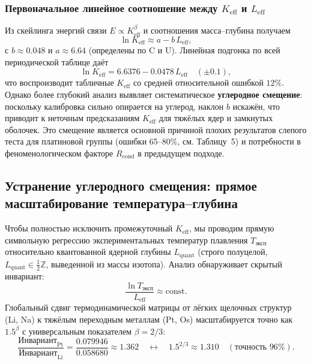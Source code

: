\documentclass[12pt,a4paper]{article}
\theoremstyle{remark}
\begin{document}
	\subsubsection{Первоначальное линейное соотношение между \(K_{\mathrm{eff}}\) и \(L_{\mathrm{eff}}\)}
	Из скейлинга энергий связи \(E \propto K_{\mathrm{eff}}^{\beta}\) и соотношения масса–глубина получаем
	\begin{equation}
		\ln K_{\mathrm{eff}} \approx a - b\,L_{\mathrm{eff}},
		\label{eq:lnK_vs_L_old}
	\end{equation}
	с \(b \approx 0.048\) и \(a \approx 6.64\) (определены по C и U).  
	Линейная подгонка по всей периодической таблице даёт
	\[
	\ln K_{\mathrm{eff}} = 6.6376 - 0.0478\,L_{\mathrm{eff}} \quad (\pm 0.1),
	\]
	что воспроизводит табличные \(K_{\mathrm{eff}}\) со средней относительной ошибкой \(12\%\).  
	Однако более глубокий анализ выявляет систематическое \textbf{углеродное смещение}: поскольку калибровка сильно опирается на углерод, наклон \(b\) искажён, что приводит к неточным предсказаниям \(K_{\mathrm{eff}}\) для тяжёлых ядер и замкнутых оболочек. Это смещение является основной причиной плохих результатов слепого теста для платиновой группы (ошибки 65–80\%, см. Таблицу~5) и потребности в феноменологическом факторе \(R_{\text{cond}}\) в предыдущем подходе.
	
	\subsection{Устранение углеродного смещения: прямое масштабирование температура–глубина}
	\label{subsec:direct_mass}
	
	Чтобы полностью исключить промежуточный \(K_{\mathrm{eff}}\), мы проводим прямую символьную регрессию экспериментальных температур плавления \(T_{\text{эксп}}\) относительно квантованной ядерной глубины \(L_{\mathrm{quant}}\) (строго полуцелой, \(L_{\mathrm{quant}} \in \frac{1}{2}\mathbb{Z}\), выведенной из массы изотопа). Анализ обнаруживает скрытый инвариант:
	\[
	\frac{\ln T_{\text{эксп}}}{L_{\mathrm{eff}}}\approx \text{const}.
	\]
	Глобальный сдвиг термодинамической матрицы от лёгких щелочных структур (Li, Na) к тяжёлым переходным металлам (Pt, Os) масштабируется точно как \(1.5^{\beta}\) с универсальным показателем \(\beta = 2/3\):
	\[
	\frac{\text{Инвариант}_{\mathrm{Pt}}}{\text{Инвариант}_{\mathrm{Li}}}=\frac{0.079946}{0.058680}\approx 1.362 \quad \longleftrightarrow \quad 1.5^{2/3}\approx 1.310 \quad (\text{точность } 96\%).
	\]
	
\end{document}
